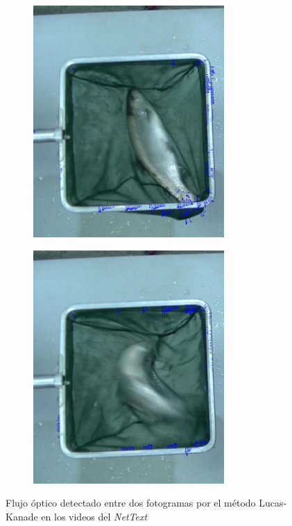 \begin{figure}[H]
    \centering
    \begin{subfigure}[b]{0.45\textwidth}
        \centering
        \includegraphics[width=0.8\textwidth]{images/6/6.2.1/LKIzquierda1.png}
    \end{subfigure}
    \begin{subfigure}[b]{0.45\textwidth}
        \centering
        \includegraphics[width=0.8\textwidth]{images/6/6.2.1/LKIzquierda2.png}
    \end{subfigure}
    \caption{Flujo óptico detectado entre dos fotogramas por el método Lucas-Kanade en los videos del \textit{NetText}}
    \label{fig:LKOpticalFlow}
\end{figure}

